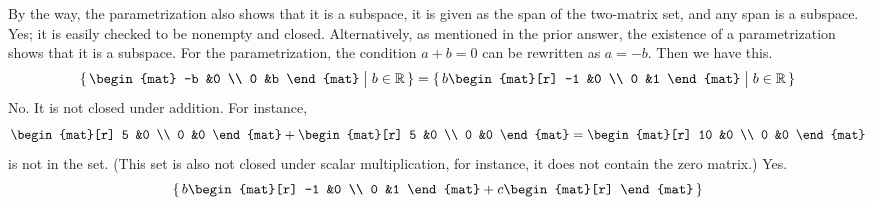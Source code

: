 \begin{exercises}
\begin{answer}
\begin{exparts}
          By the way, the parametrization also shows that it is a subspace,
          it is given as the span of the two-matrix set,
          and any span is a subspace.
        \partsitem Yes; it is easily checked to be nonempty and closed.
         Alternatively, as mentioned in the prior answer, the existence
         of a parametrization shows that it is a subspace.
         For the parametrization, 
         the condition $a+b=0$ can be rewritten as $a=-b$.
         Then we have this.
          \begin{equation*}
            \set{\begin{mat}
                    -b  &0  \\
                    0   &b
                  \end{mat}
                 \suchthat b\in\Re}
            =\set{b\begin{mat}[r]
                    -1  &0  \\
                    0   &1
                  \end{mat}
                 \suchthat b\in\Re}
          \end{equation*}
        \partsitem No.
          It is not closed under addition.
          For instance, 
          \begin{equation*}
            \begin{mat}[r]
              5  &0  \\
              0  &0
            \end{mat}
            +\begin{mat}[r]
              5  &0  \\
              0  &0
            \end{mat}
            =\begin{mat}[r]
              10  &0  \\
              0  &0
            \end{mat}
          \end{equation*}
          is not in the set.
          (This set is also not closed under scalar multiplication,
          for instance, it does not contain the zero matrix.)
        \partsitem Yes.
          \begin{equation*}
            \set{b\begin{mat}[r]
                    -1  &0  \\
                    0   &1
                  \end{mat}
                 +c\begin{mat}[r]

\end{mat}}
\end{equation*}
\end{exparts}
\end{answer}
\end{exercises}
